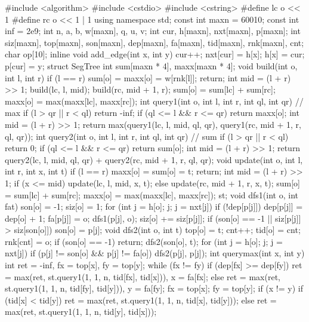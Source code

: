 \begin{cppcode}
#include <algorithm>
#include <cstdio>
#include <cstring>
#define lc o << 1
#define rc o << 1 | 1
using namespace std;
const int maxn = 60010;
const int inf = 2e9;
int n, a, b, w[maxn], q, u, v;
int cur, h[maxn], nxt[maxn], p[maxn];
int siz[maxn], top[maxn], son[maxn], dep[maxn], fa[maxn], tid[maxn], rnk[maxn],
    cnt;
char op[10];
inline void add_edge(int x, int y) {
  cur++;
  nxt[cur] = h[x];
  h[x] = cur;
  p[cur] = y;
}
struct SegTree {
  int sum[maxn * 4], maxx[maxn * 4];
  void build(int o, int l, int r) {
    if (l == r) {
      sum[o] = maxx[o] = w[rnk[l]];
      return;
    }
    int mid = (l + r) >> 1;
    build(lc, l, mid);
    build(rc, mid + 1, r);
    sum[o] = sum[lc] + sum[rc];
    maxx[o] = max(maxx[lc], maxx[rc]);
  }
  int query1(int o, int l, int r, int ql, int qr)  // max
  {
    if (l > qr || r < ql) return -inf;
    if (ql <= l && r <= qr) return maxx[o];
    int mid = (l + r) >> 1;
    return max(query1(lc, l, mid, ql, qr), query1(rc, mid + 1, r, ql, qr));
  }
  int query2(int o, int l, int r, int ql, int qr)  // sum
  {
    if (l > qr || r < ql) return 0;
    if (ql <= l && r <= qr) return sum[o];
    int mid = (l + r) >> 1;
    return query2(lc, l, mid, ql, qr) + query2(rc, mid + 1, r, ql, qr);
  }
  void update(int o, int l, int r, int x, int t) {
    if (l == r) {
      maxx[o] = sum[o] = t;
      return;
    }
    int mid = (l + r) >> 1;
    if (x <= mid)
      update(lc, l, mid, x, t);
    else
      update(rc, mid + 1, r, x, t);
    sum[o] = sum[lc] + sum[rc];
    maxx[o] = max(maxx[lc], maxx[rc]);
  }
} st;
void dfs1(int o, int fat) {
  son[o] = -1;
  siz[o] = 1;
  for (int j = h[o]; j; j = nxt[j])
    if (!dep[p[j]]) {
      dep[p[j]] = dep[o] + 1;
      fa[p[j]] = o;
      dfs1(p[j], o);
      siz[o] += siz[p[j]];
      if (son[o] == -1 || siz[p[j]] > siz[son[o]]) son[o] = p[j];
    }
}
void dfs2(int o, int t) {
  top[o] = t;
  cnt++;
  tid[o] = cnt;
  rnk[cnt] = o;
  if (son[o] == -1) return;
  dfs2(son[o], t);
  for (int j = h[o]; j; j = nxt[j])
    if (p[j] != son[o] && p[j] != fa[o]) dfs2(p[j], p[j]);
}
int querymax(int x, int y) {
  int ret = -inf, fx = top[x], fy = top[y];
  while (fx != fy) {
    if (dep[fx] >= dep[fy])
      ret = max(ret, st.query1(1, 1, n, tid[fx], tid[x])), x = fa[fx];
    else
      ret = max(ret, st.query1(1, 1, n, tid[fy], tid[y])), y = fa[fy];
    fx = top[x];
    fy = top[y];
  }
  if (x != y) {
    if (tid[x] < tid[y])
      ret = max(ret, st.query1(1, 1, n, tid[x], tid[y]));
    else
      ret = max(ret, st.query1(1, 1, n, tid[y], tid[x]));
}}
\end{cppcode}
